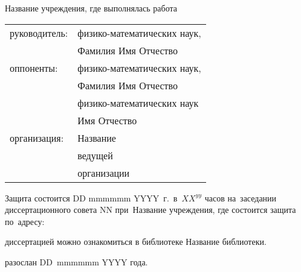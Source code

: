  Название учреждения, где выполнялась работа
\vspace{10mm}
\begin{table} [h]  
  \begin{tabular}{ll}
  \fontsize{14pt}{15pt} руководитель: & \fontsize{14pt}{15pt} физико-математических наук,                     \\
                        & \fontsize{14pt}{15pt} Фамилия Имя Отчество
\vspace{3mm} \\
  \fontsize{14pt}{15pt} оппоненты:& \fontsize{14pt}{15pt} физико-математических наук,                     \\
                        & \fontsize{14pt}{15pt} Фамилия Имя Отчество \vspace{1mm}         \\
                        & \fontsize{14pt}{15pt} физико-математических наук                    \\
                        & \fontsize{14pt}{15pt} Имя Отчество \vspace{3mm}                \\
  \fontsize{14pt}{15pt} организация:  & \fontsize{14pt}{15pt}\selectfont Название                \\
                        & \fontsize{14pt}{15pt}\selectfont ведущей                     \\
                        & \fontsize{14pt}{15pt}\selectfont организации
  \end{tabular}  
\end{table}

\vspace{20mm}
\noindent Защита состоится DD mmmmmm YYYY~г.~в~$XX^{yy}$ часов на~заседании диссертационного совета $\mbox{NN}$ при~Название учреждения, где состоится защита по~адресу: 

\vspace{15mm}
 диссертацией можно ознакомиться в библиотеке Название библиотеки.

\vspace{15mm}
 разослан DD~mmmmmm YYYY года.

